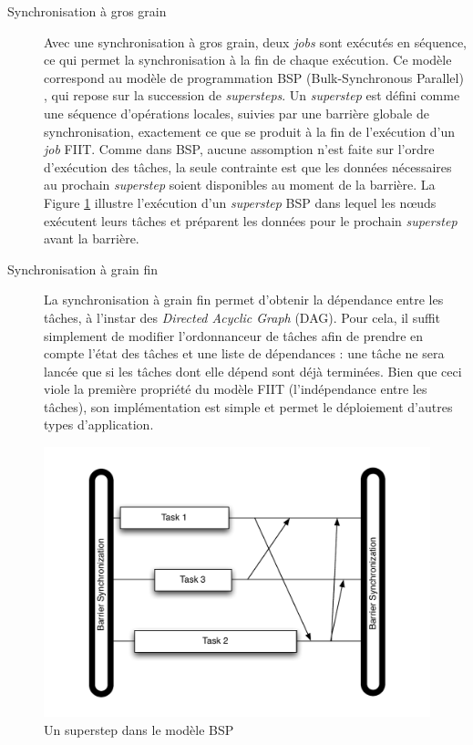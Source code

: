 \begin{description}
\item [Synchronisation à gros grain] Avec une synchronisation à gros grain, deux \textit{jobs} sont exécutés en séquence, ce qui permet la synchronisation à la fin de chaque exécution. Ce modèle correspond au modèle de programmation BSP (Bulk-Synchronous Parallel) \cite{Valiant90}, qui repose sur la succession de \textit{supersteps}. Un \textit{superstep} est défini comme une séquence d'opérations locales, suivies par une barrière globale de synchronisation, exactement ce que se produit à la fin de l'exécution d'un \textit{job} FIIT. Comme dans BSP, aucune assomption n'est faite sur l'ordre d'exécution des tâches, la seule contrainte est que les données nécessaires au prochain \textit{superstep} soient disponibles au moment de la barrière. La Figure \ref{fig:Superstep}  illustre l'exécution d'un \textit{superstep} BSP dans lequel les n{\oe}uds exécutent leurs tâches et préparent les données pour le prochain \textit{superstep} avant la barrière.

\item [Synchronisation à grain fin] La synchronisation à grain fin permet d'obtenir la dépendance entre les tâches, à l'instar des \textit{Directed Acyclic Graph} (DAG). Pour cela, il suffit simplement de modifier l'ordonnanceur de tâches afin de prendre en compte l'état des tâches et une liste de dépendances : une tâche ne sera lancée que si les tâches dont elle dépend sont déjà terminées. Bien que ceci viole la première propriété du modèle FIIT (l'indépendance entre les tâches), son implémentation est simple et permet le déploiement d'autres types d'application.
\end{description}


\begin{figure}
	\centering
		\includegraphics[width=0.5\linewidth]{img/BSP}
		\caption{Un superstep dans le modèle BSP}\label{fig:Superstep}
\end{figure}

